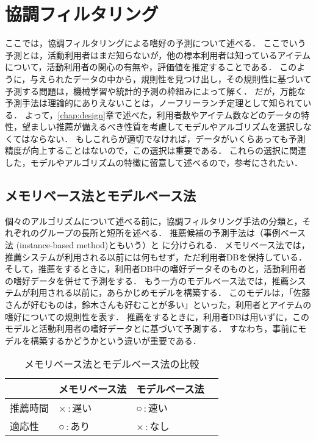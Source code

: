 \chapter{協調フィルタリング}
\label{chap:cf}

ここでは，協調フィルタリングによる嗜好の予測について述べる．
ここでいう予測とは，活動利用者はまだ知らないが，他の標本利用者は知っているアイテムについて，活動利用者の関心の有無や，評価値を推定することである．
このように，与えられたデータの中から，規則性を見つけ出し，その規則性に基づいて予測する問題は，機械学習や統計的予測の枠組みによって解く．
だが，万能な予測手法は理論的にありえないことは，ノーフリーランチ定理として知られている．
よって，\ref{chap:design}章で述べた，利用者数やアイテム数などのデータの特性，望ましい推薦が備えるべき性質を考慮してモデルやアルゴリズムを選択しなくてはならない．
もしこれらが適切でなければ，データがいくらあっても予測精度が向上することはないので，この選択は重要である．
これらの選択に関連した，モデルやアルゴリズムの特徴に留意して述べるので，参考にされたい．

\section{メモリベース法とモデルベース法}
\label{sec:memory-model}


個々のアルゴリズムについて述べる前に，協調フィルタリング手法の分類と，それぞれのグループの長所と短所を述べる．
推薦候補の予測手法は（事例ベース法 (instance-based method)ともいう）と
 に分けられる\cite{uai:98:01}．
メモリベース法では，推薦システムが利用される以前には何もせず，ただ利用者DBを保持している．
そして，推薦をするときに，利用者DB中の嗜好データそのものと，活動利用者の嗜好データを併せて予測をする．
もう一方のモデルベース法では，推薦システムが利用される以前に，あらかじめモデルを構築する．
このモデルは，「佐藤さんが好むものは，鈴木さんも好むことが多い」といった，利用者とアイテムの嗜好についての規則性を表す．
推薦をするときに，利用者DBは用いずに，このモデルと活動利用者の嗜好データとに基づいて予測する．
すなわち，事前にモデルを構築するかどうかという違いが重要である．

\begin{table}
\centering
\caption{メモリベース法とモデルベース法の比較}
\label{tab:memory-model}
\begin{tabular}{l@{\qquad}>{\centering}p{}>{\centering}p{}p{0pt}}\toprule
 & メモリベース法 & モデルベース法 & \\\midrule
推薦時間 & ×\,:\,遅い & ○\,:\,速い & \\
適応性   & ○\,:\,あり & ×\,:\,なし & \\
\bottomrule
\end{tabular}
\end{table}

